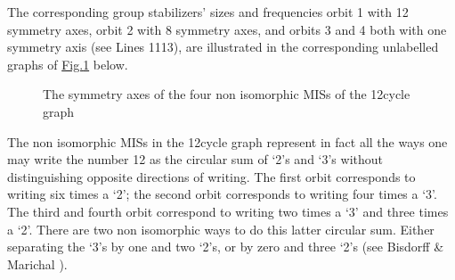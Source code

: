 \documentclass[a4paper,12pt,english]{sphinxhowto}
\let\sphinxpxdimen\pdfpxdimen\else\newdimen\sphinxpxdimen
\begin{document}
\begin{sphinxVerbatim}[commandchars=\\\{\},numbers=left,firstnumber=1,stepnumber=1]
\end{sphinxVerbatim}

The corresponding group stabilizers’ sizes and frequencies \textendash{} orbit 1 with 12 symmetry axes, orbit 2 with 8 symmetry axes, and orbits 3 and 4 both with one symmetry axis (see Lines 11\sphinxhyphen{}13), are illustrated in the corresponding unlabelled graphs of \hyperref[\detokenize{tutorial:misc12}]{Fig.\@ \ref{\detokenize{tutorial:misc12}}} below.

\begin{figure}[H]
\centering
\capstart

\noindent\sphinxincludegraphics[width=400\sphinxpxdimen]{{c12}.png}
\caption{The symmetry axes of the four non isomorphic MISs of the 12\sphinxhyphen{}cycle graph}\label{\detokenize{tutorial:misc12}}\end{figure}

The non isomorphic MISs in the 12\sphinxhyphen{}cycle graph represent in fact all the ways one may write the number 12 as the circular sum of ‘2’s and ‘3’s without distinguishing opposite directions of writing. The first orbit corresponds to writing six times a ‘2’; the second orbit corresponds to writing four times a ‘3’. The third and fourth orbit correspond to writing two times a ‘3’ and three times a ‘2’. There are two non isomorphic ways to do this latter circular sum. Either separating the ‘3’s by one and two ‘2’s, or by zero and three ‘2’s (see Bisdorff \& Marichal  ).
\end{document}
